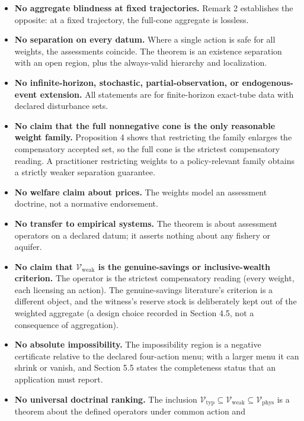 \documentclass[11pt]{article}
\providecommand{\tightlist}{\setlength{\itemsep}{0pt}\setlength{\parskip}{0pt}}
\begin{document}
\begin{itemize}
\tightlist
\item
  \textbf{No aggregate blindness at fixed trajectories.} Remark 2
  establishes the opposite: at a fixed trajectory, the full-cone
  aggregate is lossless.
\item
  \textbf{No separation on every datum.} Where a single action is safe
  for all weights, the assessments coincide. The theorem is an existence
  separation with an open region, plus the always-valid hierarchy and
  localization.
\item
  \textbf{No infinite-horizon, stochastic, partial-observation, or
  endogenous-event extension.} All statements are for finite-horizon
  exact-tube data with declared disturbance sets.
\item
  \textbf{No claim that the full nonnegative cone is the only reasonable
  weight family.} Proposition 4 shows that restricting the family
  enlarges the compensatory accepted set, so the full cone is the
  strictest compensatory reading. A practitioner restricting weights to
  a policy-relevant family obtains a strictly weaker separation
  guarantee.
\item
  \textbf{No welfare claim about prices.} The weights model an
  assessment doctrine, not a normative endorsement.
\item
  \textbf{No transfer to empirical systems.} The theorem is about
  assessment operators on a declared datum; it asserts nothing about any
  fishery or aquifer.
\item
  \textbf{No claim that \(\mathcal{V}_{\mathrm{weak}}\) is the
  genuine-savings or inclusive-wealth criterion.} The operator is the
  strictest compensatory reading (every weight, each licensing an
  action). The genuine-savings literature's criterion is a different
  object, and the witness's reserve stock is deliberately kept out of
  the weighted aggregate (a design choice recorded in Section 4.5, not a
  consequence of aggregation).
\item
  \textbf{No absolute impossibility.} The impossibility region is a
  negative certificate relative to the declared four-action menu; with a
  larger menu it can shrink or vanish, and Section 5.5 states the
  completeness status that an application must report.
\item
  \textbf{No universal doctrinal ranking.} The inclusion
  \(\mathcal{V}_{\mathrm{typ}} \subseteq \mathcal{V}_{\mathrm{weak}} \subseteq \mathcal{V}_{\mathrm{phys}}\)
  is a theorem about the defined operators under common action and

\end{itemize}
\end{document}
